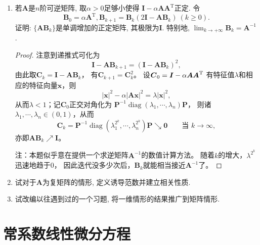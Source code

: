 \begin{2b}
\begin{enumerate}
\item 若\(\boldsymbol{A}\)是\(n\)阶可逆矩阵, 取\(\alpha>0\)足够小使得
\(\boldsymbol{I}-\alpha\boldsymbol{AA}^\mathrm{T}\)正定. 令
\[\boldsymbol{B}_0=\alpha\boldsymbol{A}^\mathrm{T},\boldsymbol{B}_{k+1}
=\boldsymbol{B}_k(2\boldsymbol{I}-\boldsymbol{AB}_k)\ (k\geqslant 0).\]
证明: \(\{\boldsymbol{AB}_k\}\)是单调增加的正定矩阵, 其极限为\(\boldsymbol{I}\). 
特别地, \(\lim_{k\rightarrow+\infty}\boldsymbol{B}_k=\boldsymbol{A}^{-1}\).
\begin{proof}
注意到递推式可化为
\[\boldsymbol{I}-\boldsymbol{A}\boldsymbol{B}_{k+1}
=(\boldsymbol{I}-\boldsymbol{A}\boldsymbol{B}_k)^2,\]
由此取$\boldsymbol{C}_k=\boldsymbol{I}-\boldsymbol{A}\boldsymbol{B}_k$，
有$\boldsymbol{C}_{k+1}=\boldsymbol{C}_k^2$。
设$\boldsymbol{C}_0=\boldsymbol{I}-\alpha\boldsymbol{AA}^{\rm T}$
有特征值$\lambda$和相应的特征向量$\boldsymbol{x}$，则
\[|\boldsymbol{x}|^2-\alpha|\boldsymbol{A}\boldsymbol{x}|^2=\lambda|\boldsymbol{x}|^2,\]
从而$\lambda<1$；记$\boldsymbol{C}_0$正交对角化为
$\boldsymbol{P}^{-1}\operatorname{diag}(\lambda_1,\cdots,\lambda_n)\boldsymbol{P}$，
则诸$\lambda_1,\cdots,\lambda_n\in(0,1)$，从而
\[\boldsymbol{C}_k=\boldsymbol{P}^{-1}\operatorname{diag}(\lambda_1^{2^k},\cdots,\lambda_n^{2^k})\boldsymbol{P}\searrow\boldsymbol{0}\qquad\text{当 }k\to\infty,\]
亦即$\boldsymbol{A}\boldsymbol{B}_k\nearrow\boldsymbol{I}$。

注：本题似乎意在提供一个求逆矩阵$\boldsymbol{A}^{-1}$的数值计算方法。
随着$k$的增大，$\lambda^{2^k}$迅速地趋于$0$，
因此迭代没多少次后，$\boldsymbol{B}_k$就能相当接近$\boldsymbol{A}^{-1}$了。
\end{proof}

\item 试对于\(\boldsymbol{A}\)为复矩阵的情形, 定义诱导范数并建立相关性质.

\item 试改编以往遇到过的一个习题, 将一维情形的结果推广到矩阵情形.
\end{enumerate}
\end{2b}

\section{常系数线性微分方程}
